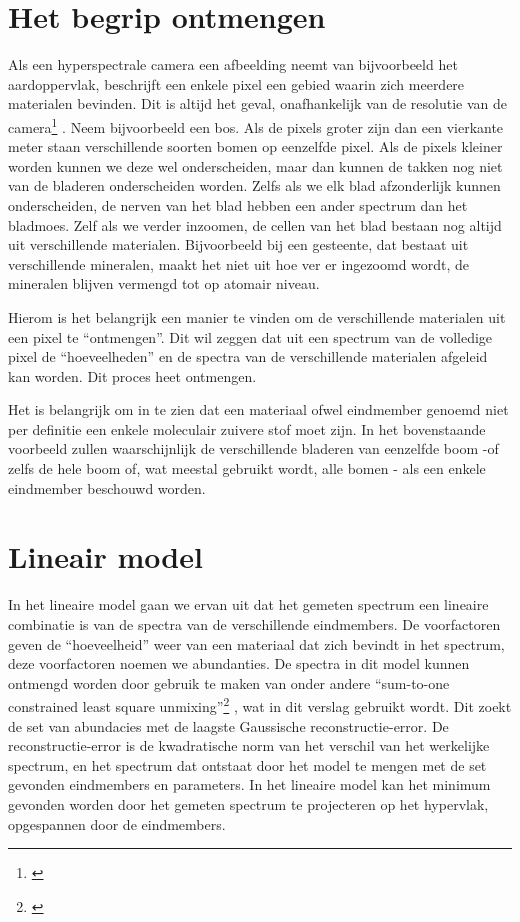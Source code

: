\documentclass[12pt]{report}
\newcommand{\footcite}[1]{\cite{#1}\let\thefootnote\relax \footnote{\cite{#1} \bibentry{#1}} }
\begin{document}
\section{Het begrip ontmengen}

Als een hyperspectrale camera een afbeelding neemt van bijvoorbeeld het aardoppervlak, beschrijft een enkele pixel een gebied waarin zich meerdere materialen bevinden. Dit is altijd het geval, onafhankelijk van de resolutie van de camera\footcite{dias12}. Neem bijvoorbeeld een bos. Als de pixels groter zijn dan een vierkante meter staan verschillende soorten bomen op eenzelfde pixel. Als de pixels kleiner worden kunnen we deze wel onderscheiden, maar dan kunnen de takken nog niet van de bladeren onderscheiden worden. Zelfs als we elk blad afzonderlijk kunnen onderscheiden, de nerven van het blad hebben een ander spectrum dan het bladmoes. Zelf als we verder inzoomen, de cellen van het blad bestaan nog altijd uit verschillende materialen. Bijvoorbeeld bij een gesteente, dat bestaat uit verschillende mineralen, maakt het niet uit hoe ver er ingezoomd wordt, de mineralen blijven vermengd tot op atomair niveau.

Hierom is het belangrijk een manier te vinden om de verschillende materialen uit een pixel te ``ontmengen''. Dit wil zeggen dat uit een spectrum van de volledige pixel de ``hoeveelheden'' en de spectra van de verschillende materialen afgeleid kan worden. Dit proces heet ontmengen.

Het is belangrijk om in te zien dat een materiaal ofwel eindmember genoemd niet per definitie een enkele moleculair zuivere stof moet zijn. In het bovenstaande voorbeeld zullen waarschijnlijk de verschillende bladeren van eenzelfde boom -of zelfs de hele boom of, wat meestal gebruikt wordt, alle bomen - als een enkele eindmember beschouwd worden.


\section{Lineair model}
In het lineaire model gaan we ervan uit dat het gemeten spectrum een lineaire combinatie is van de spectra van de verschillende eindmembers. De voorfactoren geven de ``hoeveelheid'' weer van een materiaal dat zich bevindt in het spectrum, deze voorfactoren noemen we abundanties. De spectra in dit model kunnen ontmengd worden door gebruik te maken van onder andere ``sum-to-one constrained least square unmixing''\footcite{mesma}, wat in dit verslag gebruikt wordt. Dit zoekt de set van abundacies met de laagste Gaussische reconstructie-error. De reconstructie-error is de kwadratische norm van het verschil van het werkelijke spectrum, en het spectrum dat ontstaat door het model te mengen met de set gevonden eindmembers en parameters. In het lineaire model kan het minimum gevonden worden door het gemeten spectrum te projecteren op het hypervlak, opgespannen door de eindmembers.
\end{document}
